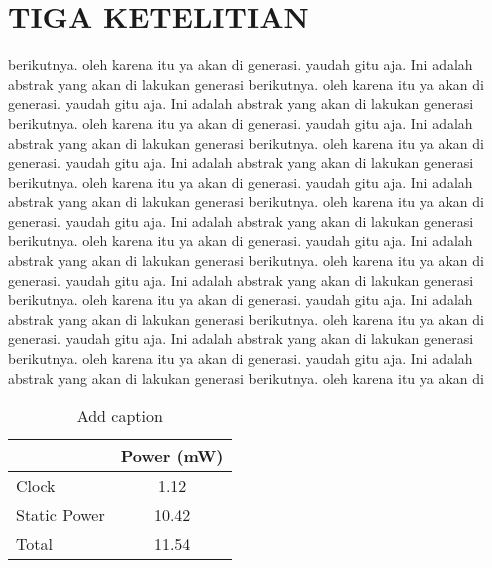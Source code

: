 \section{TIGA KETELITIAN}
berikutnya. oleh karena itu ya akan di generasi. yaudah gitu aja. Ini adalah abstrak yang akan di lakukan generasi berikutnya. oleh karena itu ya akan di generasi. yaudah gitu aja. Ini adalah abstrak yang akan di lakukan generasi berikutnya. oleh karena itu ya akan di generasi. yaudah gitu aja. Ini adalah abstrak yang akan di lakukan generasi berikutnya. oleh karena itu ya akan di generasi. yaudah gitu aja. Ini adalah abstrak yang akan di lakukan generasi berikutnya. oleh karena itu ya akan di generasi. yaudah gitu aja. Ini adalah abstrak yang akan di lakukan generasi berikutnya. oleh karena itu ya akan di generasi. yaudah gitu aja. Ini adalah abstrak yang akan di lakukan generasi berikutnya. oleh karena itu ya akan di generasi. yaudah gitu aja. Ini adalah abstrak yang akan di lakukan generasi berikutnya. oleh karena itu ya akan di generasi. yaudah gitu aja. Ini adalah abstrak yang akan di lakukan generasi berikutnya. oleh karena itu ya akan di generasi. yaudah gitu aja. Ini adalah abstrak yang akan di lakukan generasi berikutnya. oleh karena itu ya akan di generasi. yaudah gitu aja. Ini adalah abstrak yang akan di lakukan generasi berikutnya. oleh karena itu ya akan di generasi. yaudah gitu aja. Ini adalah abstrak yang akan di lakukan generasi berikutnya. oleh karena itu ya akan di

\begin{table}[htbp]
	\centering
	\caption{Add caption}
	\begin{tabular}{|l|c|}
		\hline
		\rowcolor[rgb]{ .906,  .902,  .902} \multicolumn{1}{|c|}{Unprotected} & Power (mW) \bigstrut\\
		\hline
		Clock & 1.12 \bigstrut\\
		\hline
		Static Power & 10.42 \bigstrut\\
		\hline
		Total & 11.54 \bigstrut\\
		\hline
	\end{tabular}%
	\label{tab:addlabel}%
\end{table}%


